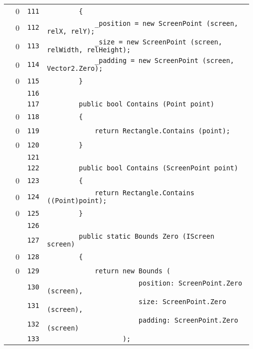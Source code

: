 \documentclass[a4paper,10pt]{article}
\begin{document}
\begin{longtable}[l]{lrrl}
\cellcolor{red} & 0 & \verb~111~ & \verb~        {~\\
\cellcolor{red} & 0 & \verb~112~ & \verb~            _position = new ScreenPoint (screen, relX, relY);~\\
\cellcolor{red} & 0 & \verb~113~ & \verb~            _size = new ScreenPoint (screen, relWidth, relHeight);~\\
\cellcolor{red} & 0 & \verb~114~ & \verb~            _padding = new ScreenPoint (screen, Vector2.Zero);~\\
\cellcolor{red} & 0 & \verb~115~ & \verb~        }~\\
\cellcolor{gray} &  & \verb~116~ & \verb~~\\
\cellcolor{gray} &  & \verb~117~ & \verb~        public bool Contains (Point point)~\\
\cellcolor{red} & 0 & \verb~118~ & \verb~        {~\\
\cellcolor{red} & 0 & \verb~119~ & \verb~            return Rectangle.Contains (point);~\\
\cellcolor{red} & 0 & \verb~120~ & \verb~        }~\\
\cellcolor{gray} &  & \verb~121~ & \verb~~\\
\cellcolor{gray} &  & \verb~122~ & \verb~        public bool Contains (ScreenPoint point)~\\
\cellcolor{red} & 0 & \verb~123~ & \verb~        {~\\
\cellcolor{red} & 0 & \verb~124~ & \verb~            return Rectangle.Contains ((Point)point);~\\
\cellcolor{red} & 0 & \verb~125~ & \verb~        }~\\
\cellcolor{gray} &  & \verb~126~ & \verb~~\\
\cellcolor{gray} &  & \verb~127~ & \verb~        public static Bounds Zero (IScreen screen)~\\
\cellcolor{red} & 0 & \verb~128~ & \verb~        {~\\
\cellcolor{red} & 0 & \verb~129~ & \verb~            return new Bounds (~\\
\cellcolor{gray} &  & \verb~130~ & \verb~                       position: ScreenPoint.Zero (screen),~\\
\cellcolor{gray} &  & \verb~131~ & \verb~                       size: ScreenPoint.Zero (screen),~\\
\cellcolor{gray} &  & \verb~132~ & \verb~                       padding: ScreenPoint.Zero (screen)~\\
\cellcolor{gray} &  & \verb~133~ & \verb~                   );~\\

\end{longtable}
\end{document}
